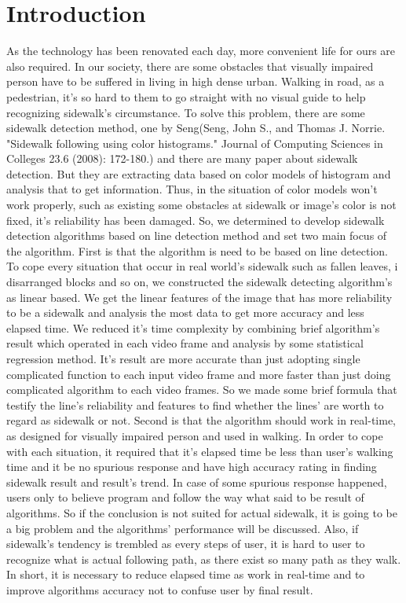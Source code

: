 \section{Introduction}
\label{sec:intro}
As the technology has been renovated each day, more convenient life for ours are also required. In our society, there are some obstacles that visually impaired person have to be suffered in living in high dense urban. Walking in road, as a pedestrian, it's so hard to them to go straight with no visual guide to help recognizing sidewalk's circumstance. To solve this problem, there are some sidewalk detection method, one by Seng(Seng, John S., and Thomas J. Norrie. "Sidewalk following using color histograms." Journal of Computing Sciences in Colleges 23.6 (2008): 172-180.) and there are many paper about sidewalk detection. But they are extracting data based on color models of histogram and analysis that to get information. Thus, in the situation of color models won't work properly, such as existing some obstacles at sidewalk or image's color is not fixed, it's reliability has been damaged. So, we determined to develop sidewalk detection algorithms based on line detection method and set two main focus of the algorithm. 
\newline First is that the algorithm is need to be based on line detection. To cope every situation that occur in real world's sidewalk such as fallen leaves, i	disarranged blocks and so on, we constructed the sidewalk detecting algorithm's as linear based. We get the linear features of the image that has more reliability to be a sidewalk and analysis the most data to get more accuracy and less elapsed time. We reduced it's time complexity by combining brief algorithm's result which operated in each video frame and analysis by some statistical regression method. It's result are more accurate than just adopting single complicated function to each input video frame and more faster than just doing complicated algorithm to each video frames. So we made some brief formula that testify the line's reliability and features to find whether the lines' are worth to regard as sidewalk or not. 
\newline 
Second is that the algorithm should work in real-time, as designed for visually impaired person and used in walking. In order to cope with each situation, it required that it's elapsed time be less than user's walking time and it be no spurious response and have high accuracy rating in finding sidewalk result and result's trend. In case of some spurious response happened, users only to believe program and follow the way what said to be result of algorithms. So if the conclusion is not suited for actual sidewalk, it is going to be a big problem and the algorithms' performance will be discussed. Also, if sidewalk's tendency is trembled as every steps of user, it is hard to user to recognize what is actual following path, as there exist so many path as they walk. In short, it is necessary to reduce elapsed time as work in real-time and to improve algorithms accuracy not to confuse user by final result. 
